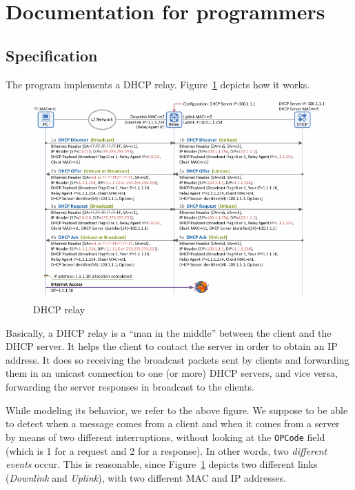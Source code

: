 \section{Documentation for programmers}
\subsection{Specification}
The program implements a DHCP relay. Figure~\ref{fig:dhcp} depicts how it works.
\begin{figure}[h]
	\centering\includegraphics[scale=0.5]{images/dhcp}
	\caption{DHCP relay\protect\footnotemark}
	\label{fig:dhcp}
\end{figure}

Basically, a DHCP relay is a ``man in the middle'' between the client and the DHCP server. It helps the client to contact the server in order to obtain an IP address. It does so receiving the broadcast packets sent by clients and forwarding them in an unicast connection to one (or more) DHCP servers, and vice versa, forwarding the server responses in broadcast to the clients. 

While modeling its behavior, we refer to the above figure. We suppose to be able to detect when a message comes from a client and when it comes from a server by means of two different interruptions, without looking at the \texttt{OPCode} field (which is 1 for a request and 2 for a response). In other words, two \textit{different events} occur. This is reasonable, since Figure~\ref{fig:dhcp} depicts two different links (\textit{Downlink} and \textit{Uplink}), with two different MAC and IP addresses. 

